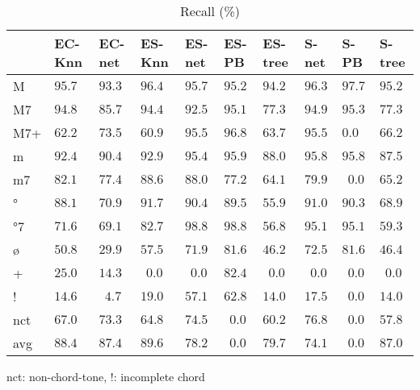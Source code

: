 \documentclass{article}
\begin{document}
\begin{table}
  \centering
  \begin{tabular}{l|p{.5cm}p{.5cm}p{.5cm}p{.5cm}p{.5cm}p{.5cm}p{.5cm}p{.5cm}p{.5cm}}

   &EC-Knn&EC-net &ES-Knn &ES-net &ES-PB  &ES-tree&S-net  &S-PB   &S-tree \\
\hline                                            
M  &$95.7$&$ 93.3$&$ 96.4$&$95.7 $&$ 95.2$&$ 94.2$&$96.3 $&$ 97.7$&$  95.2$ \\
M7 &$94.8$&$ 85.7$&$ 94.4$&$92.5 $&$ 95.1$&$ 77.3$&$94.9 $&$ 95.3$&$  77.3$ \\
M7+&$62.2$&$ 73.5$&$ 60.9$&$95.5 $&$ 96.8$&$ 63.7$&$95.5 $&$  0.0$&$  66.2$ \\
m  &$92.4$&$ 90.4$&$ 92.9$&$95.4 $&$ 95.9$&$ 88.0$&$95.8 $&$ 95.8$&$  87.5$ \\
m7 &$82.1$&$ 77.4$&$ 88.6$&$88.0 $&$ 77.2$&$ 64.1$&$79.9 $&$~~0.0$&$  65.2$ \\
°  &$88.1$&$ 70.9$&$ 91.7$&$90.4 $&$ 89.5$&$ 55.9$&$91.0 $&$ 90.3$&$  68.9$ \\
°7 &$71.6$&$ 69.1$&$ 82.7$&$98.8 $&$ 98.8$&$ 56.8$&$95.1 $&$ 95.1$&$  59.3$ \\
ø  &$50.8$&$ 29.9$&$ 57.5$&$71.9 $&$ 81.6$&$ 46.2$&$72.5 $&$ 81.6$&$  46.4$ \\
+  &$25.0$&$ 14.3$&$~~0.0$&$~~0.0$&$ 82.4$&$~~0.0$&$~~0.0$&$~~0.0$&$ ~~0.0$ \\
!  &$14.6$&$~~4.7$&$ 19.0$&$57.1 $&$ 62.8$&$ 14.0$&$17.5 $&$~~0.0$&$  14.0$ \\
nct&$67.0$&$ 73.3$&$ 64.8$&$74.5 $&$~~0.0$&$ 60.2$&$76.8 $&$~~0.0$&$  57.8$ \\
avg&$88.4$&$ 87.4$&$ 89.6$&$78.2 $&$~~0.0$&$ 79.7$&$74.1 $&$~~0.0$&$  87.0$ \\
  \end{tabular}                                                        

\medskip

nct: non-chord-tone, !: incomplete chord
  \caption{Recall (\%)}
  \label{tab:recall}
\end{table}
\end{document}

